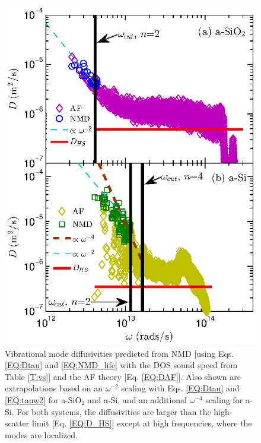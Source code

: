 \documentclass[aps,prb,onecolumn,preprint,superscriptaddress,footinbib,amsmath,amssymb,floatfix]{revtex4}
\begin{document}
\begin{figure}
\begin{center}
\includegraphics[scale=1.0]
{fig5.eps}
\vspace*{-5mm}
\end{center}
\caption{\label{FIG:diffusivities} Vibrational mode diffusivities 
predicted from NMD [using Eqs. \eqref{EQ:Dtau} and 
\eqref{EQ:NMD_life} with the DOS sound speed from Table \ref{T:vs}] 
and the AF theory [Eq. \eqref{EQ:DAF}]. 
Also shown are  
extrapolations based on an $\omega^{-2}$ scaling with 
Eqs. \eqref{EQ:Dtau} and \eqref{EQ:tauw2} for a-SiO$_2$ and a-Si, 
and an additional $\omega^{-4}$ scaling for a-Si. For both systems, 
the diffusivities are larger than the high-scatter limit 
[Eq. \eqref{EQ:D_HS}] except at high frequencies, where the modes 
are localized.
}
\end{figure}
\end{document}
